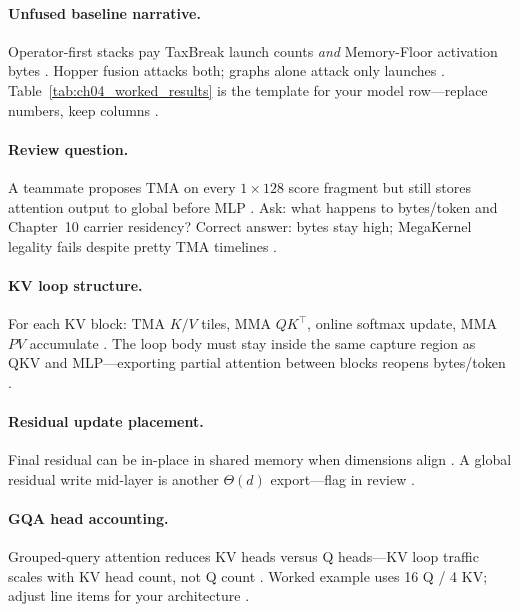 \paragraph{Unfused baseline narrative.}
Operator-first stacks pay TaxBreak launch counts \emph{and} Memory-Floor activation bytes \citep{taxbreak2026,memoryfloor2026}.
Hopper fusion attacks both; graphs alone attack only launches \citep{nvidia2024cudagraphs,patel2025llminference}.
Table~\ref{tab:ch04_worked_results} is the template for your model row---replace numbers, keep columns \citep{yirage2026,taxbreak2026}.

\paragraph{Review question.}
A teammate proposes TMA on every $1{\times}128$ score fragment but still stores attention output to global before MLP \citep{memoryfloor2026,dao2022flashattention}.
Ask: what happens to bytes/token and Chapter~10 carrier residency? \citep{yirage2026,dao2022flashattention}
Correct answer: bytes stay high; MegaKernel legality fails despite pretty TMA timelines \citep{memoryfloor2026,patel2025llminference}.

\paragraph{KV loop structure.}
For each KV block: TMA $K/V$ tiles, MMA $QK^\top$, online softmax update, MMA $PV$ accumulate \citep{dao2022flashattention,semianalysis2024tma,dao2023flashdecoding}.
The loop body must stay inside the same capture region as QKV and MLP---exporting partial attention between blocks reopens bytes/token \citep{memoryfloor2026,yirage2026,taxbreak2026}.

\paragraph{Residual update placement.}
Final residual can be in-place in shared memory when dimensions align \citep{dao2022flashattention,yirage2026}.
A global residual write mid-layer is another $\Theta(d)$ export---flag in review \citep{memoryfloor2026,chen2020compilerbasedhardw}.

\paragraph{GQA head accounting.}
Grouped-query attention reduces KV heads versus Q heads---KV loop traffic scales with KV head count, not Q count \citep{kwon2023vllm,dao2022flashattention,taxbreak2026}.
Worked example uses 16 Q / 4 KV; adjust line items for your architecture \citep{yirage2026,patel2025llminference}.

